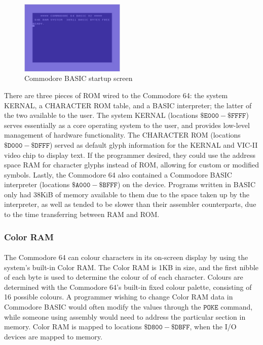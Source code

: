 \documentclass{article}
\begin{document}
\paragraph{}
\begin{figure}
\begin{center}
\includegraphics[width=5cm]{c64_basic}
\end{center}
\caption{Commodore BASIC startup screen}
\end{figure}
There are three pieces of ROM wired to the Commodore 64: the system KERNAL, a CHARACTER ROM table, and a BASIC interpreter; the latter of the two available to the user. The system KERNAL (locations $\mathtt{\$E000 - \$FFFF}$) serves essentially as a core operating system to the user, and provides low-level management of hardware functionality. The CHARACTER ROM (locations $\mathtt{\$D000 - \$DFFF}$) served as default glyph information for the KERNAL and VIC-II video chip to display text. If the programmer desired, they could use the address space RAM for character glyphs instead of ROM, allowing for custom or modified symbols. Lastly, the Commodore 64 also contained a Commodore BASIC interpreter (locations $\mathtt{\$A000 - \$BFFF}$) on the device. Programs written in BASIC only had 38KiB of memory available to them due to the space taken up by the interpreter, as well as tended to be slower than their assembler counterparts, due to the time transferring between RAM and ROM.

\subsubsection{Color RAM}
\paragraph{}
The Commodore 64 can colour characters in its on-screen display by using the system's built-in Color RAM. The Color RAM is 1KB in size, and the first nibble of each byte is used to determine the colour of of each character. Colours are determined with the Commodore 64's built-in fixed colour palette, consisting of 16 possible colours. A programmer wishing to change Color RAM data in Commodore BASIC would often modify the values through the $\mathtt{POKE}$ command, while someone using assembly would need to address the particular section in memory. Color RAM is mapped to locations $\mathtt{\$D800 - \$DBFF}$, when the I/O devices are mapped to memory.
\end{document}
